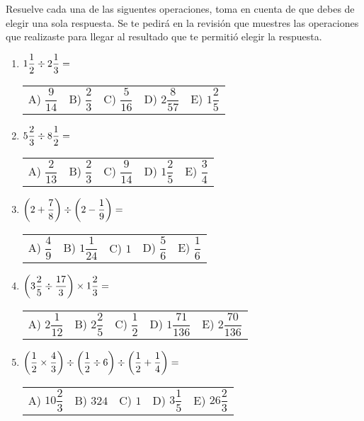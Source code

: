 Resuelve cada una de las siguentes operaciones, toma en cuenta de que debes de elegir una sola respuesta. Se te pedirá en la revisión que muestres las operaciones que realizaste para llegar al resultado que te permitió elegir la respuesta.

\begin{enumerate}[label=\arabic*)]
\item $1 \dfrac{1}{2} \divisionsymbol 2 \dfrac{1}{3} =$
\begin{table}[H]
\large
\begin{tabular}{p{2cm} p{2cm} p{2cm} p{2cm} p{2cm}}
A) $\dfrac{9}{14}$ & B) $\dfrac{2}{3}$ & C) $\dfrac{5}{16}$ & D) $2 \dfrac{8}{57}$ & E) $1 \dfrac{2}{5}$ \\
\end{tabular}
\end{table}
\item $5 \dfrac{2}{3} \divisionsymbol 8 \dfrac{1}{2} =$
\begin{table}[H]
\large
\begin{tabular}{p{2cm} p{2cm} p{2cm} p{2cm} p{2cm}}
A) $\dfrac{2}{13}$ & B) $\dfrac{2}{3}$ & C) $\dfrac{9}{14}$ & D) $1 \dfrac{2}{5}$ & E) $\dfrac{3}{4}$ \\
\end{tabular}
\end{table}
\item $\left( 2  + \dfrac{7}{8} \right) \divisionsymbol \left( 2 - \dfrac{1}{9} \right) =$
\begin{table}[H]
\large
\begin{tabular}{p{2cm} p{2cm} p{2cm} p{2cm} p{2cm}}
A) $\dfrac{4}{9}$ & B) $1 \dfrac{1}{24}$ & C) $1$ & D) $\dfrac{5}{6}$ & E) $\dfrac{1}{6}$ \\
\end{tabular}
\end{table}
\item $\left( 3 \dfrac{2}{5} \divisionsymbol  \dfrac{17}{3} \right) \times 1 \dfrac{2}{3} =$
\begin{table}[H]
\large
\begin{tabular}{p{2cm} p{2cm} p{2cm} p{2cm} p{2cm}}
A) $2 \dfrac{1}{12}$ & B) $2 \dfrac{2}{5}$ & C) $\dfrac{1}{2}$ & D) $1 \dfrac{71}{136}$ & E) $2 \dfrac{70}{136}$ \\
\end{tabular}
\end{table}
\item $\left( \dfrac{1}{2} \times \dfrac{4}{3} \right)  \divisionsymbol  \left( \dfrac{1}{2} \divisionsymbol 6 \right) \divisionsymbol \left( \dfrac{1}{2} + \dfrac{1}{4} \right) =$
\begin{table}[H]
\large
\begin{tabular}{p{2cm} p{2cm} p{2cm} p{2cm} p{2cm}}
A) $10 \dfrac{2}{3}$ & B) $324$ & C) $1$ & D) $3 \dfrac{1}{5}$ & E) $26 \dfrac{2}{3}$ \\
\end{tabular}
\end{table}
\end{enumerate}


